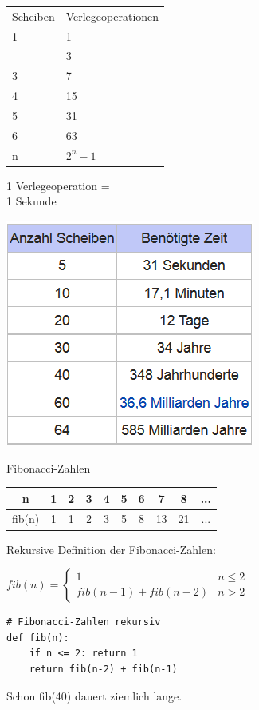 \documentclass{beamer}
\begin{document}
\begin{frame}[fragile]
\begin{minipage}[t]{6cm}
\begin{tabular}{ll}
Scheiben & Verlegeoperationen\\
1  &  1 \\   \pause
2 &  3  \\
3 &   7 \\
4 & 15 \\
5 & 31 \\
6 & 63 \\
n &  \pause $2^n-1$  
\end{tabular}
\end{minipage}  \pause
\begin{minipage}[t]{5cm}
1 Verlegeoperation = \\
1 Sekunde 

\includegraphics[scale=0.7]{Hanoi2.png}
\end{minipage}


\end{frame}

\begin{frame}[fragile]

Fibonacci-Zahlen

\begin{tabular}{|c|c|c|c|c|c|c|c|c|c|}
\hline n  & 1 & 2 & 3 & 4 & 5 & 6 & 7 & 8 &...\\
\hline fib(n)  & 1 & 1 & 2 & 3 & 5 & 8 & 13 & 21 & ...\\
\hline
\end{tabular} \pause

Rekursive Definition der Fibonacci-Zahlen:

$fib(n) =\begin{cases}
 1   &  n \le 2 \\
 fib(n-1) + fib(n-2) & n > 2 
\end{cases} $ \pause

\begin{lstlisting} 
# Fibonacci-Zahlen rekursiv
def fib(n):
    if n <= 2: return 1
    return fib(n-2) + fib(n-1)
\end{lstlisting} \pause

Schon fib(40) dauert ziemlich lange.
\end{frame}
\end{document}
